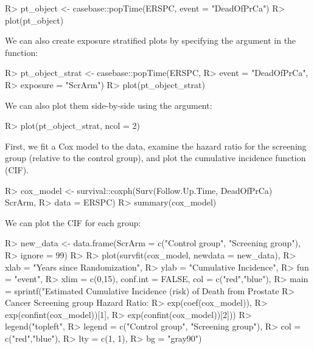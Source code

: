 \documentclass[
]{jss}
\begin{document}
\begin{CodeChunk}

\begin{CodeInput}
R> pt_object <- casebase::popTime(ERSPC, event = "DeadOfPrCa")
R> plot(pt_object)
\end{CodeInput}
\end{CodeChunk}

We can also create exposure stratified plots by specifying the
 argument in the  function:

\begin{CodeChunk}

\begin{CodeInput}
R> pt_object_strat <- casebase::popTime(ERSPC, 
R>                                      event = "DeadOfPrCa", 
R>                                      exposure = "ScrArm")
R> plot(pt_object_strat)
\end{CodeInput}
\end{CodeChunk}

We can also plot them side-by-side using the  argument:

\begin{CodeChunk}

\begin{CodeInput}
R> plot(pt_object_strat, ncol = 2)
\end{CodeInput}
\end{CodeChunk}

First, we fit a Cox model to the data, examine the hazard ratio for the
screening group (relative to the control group), and plot the cumulative
incidence function (CIF).

\begin{CodeChunk}

\begin{CodeInput}
R> cox_model <- survival::coxph(Surv(Follow.Up.Time, DeadOfPrCa) ~ ScrArm, 
R>                              data = ERSPC)
R> summary(cox_model)
\end{CodeInput}
\end{CodeChunk}

We can plot the CIF for each group:

\begin{CodeChunk}

\begin{CodeInput}
R> new_data <- data.frame(ScrArm = c("Control group", "Screening group"),
R>                        ignore = 99)
R> 
R> plot(survfit(cox_model, newdata = new_data),
R>      xlab = "Years since Randomization", 
R>      ylab = "Cumulative Incidence", 
R>      fun = "event",
R>      xlim = c(0,15), conf.int = FALSE, col = c("red","blue"), 
R>      main = sprintf("Estimated Cumulative Incidence (risk) of Death from Prostate 
R>                     Cancer Screening group Hazard Ratio: %
R>                     exp(coef(cox_model)), 
R>                     exp(confint(cox_model))[1], 
R>                     exp(confint(cox_model))[2]))
R> legend("topleft", 
R>        legend = c("Control group", "Screening group"), 
R>        col = c("red","blue"),
R>        lty = c(1, 1), 
R>        bg = "gray90")
\end{CodeInput}
\end{CodeChunk}
\end{document}
